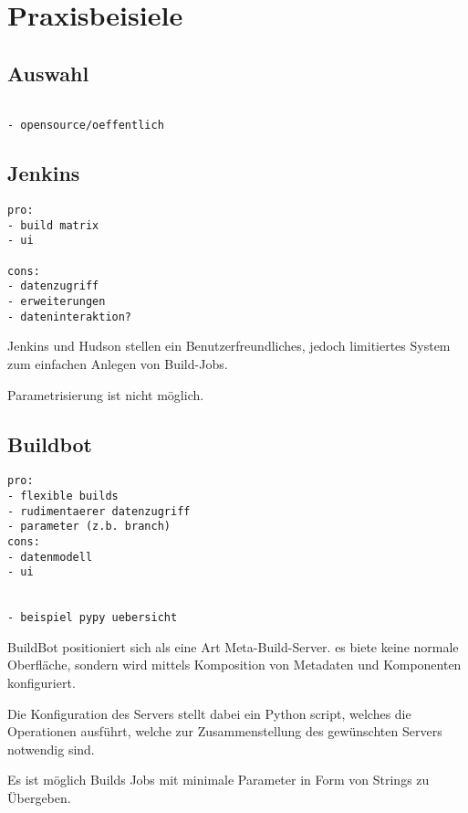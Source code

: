 \section{Praxisbeisiele}

\subsection{Auswahl}

\begin{verbatim}

- opensource/oeffentlich
\end{verbatim}

\subsection{Jenkins}

\begin{verbatim}
pro:
- build matrix
- ui

cons:
- datenzugriff
- erweiterungen
- dateninteraktion?

\end{verbatim}

Jenkins und Hudson stellen ein Benutzerfreundliches,
jedoch limitiertes System zum einfachen Anlegen von Build-Jobs.

Parametrisierung ist nicht möglich.

\subsection{Buildbot}


\begin{verbatim}
pro:
- flexible builds
- rudimentaerer datenzugriff
- parameter (z.b. branch)
cons:
- datenmodell
- ui


- beispiel pypy uebersicht

\end{verbatim}


BuildBot positioniert sich als eine Art Meta-Build-Server.
es biete keine normale Oberfläche, sondern wird mittels
Komposition von Metadaten und Komponenten konfiguriert.

Die Konfiguration des Servers stellt dabei ein Python script,
welches die Operationen ausführt, welche zur Zusammenstellung des gewünschten Servers notwendig sind.

Es ist möglich Builds Jobs mit minimale Parameter in Form von Strings zu Übergeben.

